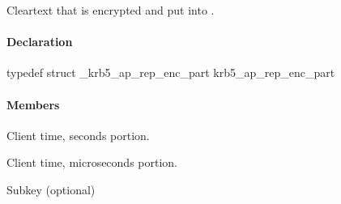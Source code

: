 \documentclass[letterpaper,10pt,english]{sphinxmanual}
\begin{document}
Cleartext that is encrypted and put into  .


\paragraph{Declaration}
\label{appdev/refs/types/krb5_ap_rep_enc_part:declaration}
typedef struct \_krb5\_ap\_rep\_enc\_part  krb5\_ap\_rep\_enc\_part


\paragraph{Members}
\label{appdev/refs/types/krb5_ap_rep_enc_part:members}

\begin{fulllineitems}
\label{appdev/refs/types/krb5_ap_rep_enc_part:c.krb5_ap_rep_enc_part.magic}
\end{fulllineitems}


\begin{fulllineitems}
\label{appdev/refs/types/krb5_ap_rep_enc_part:c.krb5_ap_rep_enc_part.ctime}
Client time, seconds portion.

\end{fulllineitems}


\begin{fulllineitems}
\label{appdev/refs/types/krb5_ap_rep_enc_part:c.krb5_ap_rep_enc_part.cusec}
Client time, microseconds portion.

\end{fulllineitems}


\begin{fulllineitems}
\label{appdev/refs/types/krb5_ap_rep_enc_part:c.krb5_ap_rep_enc_part.subkey}
Subkey (optional)

\end{fulllineitems}
\end{document}
